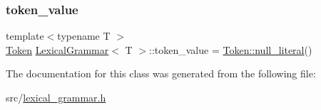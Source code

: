 \mbox{\label{class_lexical_grammar_a3230ebef29d379b7b4c276e2a771edc4}} 
\subsubsection{\texorpdfstring{token\+\_\+value}{token\_value}}
{\footnotesize\ttfamily template$<$typename T $>$ \\
\hyperlink{class_token}{Token} \hyperlink{class_lexical_grammar}{Lexical\+Grammar}$<$ T $>$\+::token\+\_\+value = \hyperlink{class_token_af892768a64f034c6d941281fd7d6b758}{Token\+::null\+\_\+literal}()}



The documentation for this class was generated from the following file\+:\begin{DoxyCompactItemize}
\item 
src/\hyperlink{lexical__grammar_8h}{lexical\+\_\+grammar.\+h}\end{DoxyCompactItemize}
